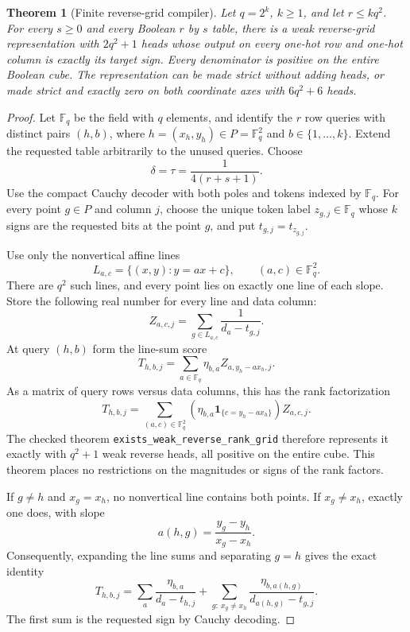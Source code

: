 \documentclass[11pt]{article}
\newtheorem{theorem}{Theorem}
\newcommand{\F}{\mathbb F}
\begin{document}
\begin{theorem}[Finite reverse-grid compiler]
Let $q=2^k$, $k\geq1$, and let $r\leq kq^2$. For every $s\geq0$ and every
Boolean $r$ by $s$ table, there is a weak reverse-grid representation with
$2q^2+1$ heads whose output on every one-hot row and one-hot column is exactly
its target sign. Every denominator is positive on the entire Boolean cube.
The representation can be made strict without adding heads, or made strict
and exactly zero on both coordinate axes with $6q^2+6$ heads.
\end{theorem}
\begin{proof}
Let $\F_q$ be the field with $q$ elements, and identify the $r$ row queries
with distinct pairs $(h,b)$, where $h=(x_h,y_h)\in P=\F_q^2$ and
$b\in\{1,\ldots,k\}$. Extend the requested table arbitrarily to the unused
queries. Choose
\[
 \delta=\tau=\frac1{4(r+s+1)}.
\]
Use the compact Cauchy decoder with both poles and tokens indexed by $\F_q$.
For every point $g\in P$ and column $j$, choose the unique token label
$z_{g,j}\in\F_q$ whose $k$ signs are the requested bits at the point $g$,
and put $t_{g,j}=t_{z_{g,j}}$.

Use only the nonvertical affine lines
\[
 L_{a,c}=\{(x,y):y=ax+c\},\qquad (a,c)\in\F_q^2.
\]
There are $q^2$ such lines, and every point lies on exactly one line of each
slope. Store the following real number for every line and data column:
\[
 Z_{a,c,j}=\sum_{g\in L_{a,c}}\frac1{d_a-t_{g,j}}.
\]
At query $(h,b)$ form the line-sum score
\[
 T_{h,b,j}=\sum_{a\in\F_q}\eta_{b,a}Z_{a,y_h-ax_h,j}.
\]
As a matrix of query rows versus data columns, this has the rank factorization
\[
 T_{h,b,j}=\sum_{(a,c)\in\F_q^2}
 \left(\eta_{b,a}\mathbf1_{\{c=y_h-ax_h\}}\right) Z_{a,c,j}.
\]
The checked theorem \texttt{exists\_weak\_reverse\_rank\_grid} therefore
represents it exactly with $q^2+1$ weak reverse heads, all positive on the
entire cube. This theorem places no restrictions on the magnitudes or signs
of the rank factors.

If $g\ne h$ and $x_g=x_h$, no nonvertical line contains both points. If
$x_g\ne x_h$, exactly one does, with slope
\[
 a(h,g)=\frac{y_g-y_h}{x_g-x_h}.
\]
Consequently, expanding the line sums and separating $g=h$ gives the exact
identity
\[
 T_{h,b,j}=
 \sum_a\frac{\eta_{b,a}}{d_a-t_{h,j}}
 +\sum_{g:\ x_g\ne x_h}
       \frac{\eta_{b,a(h,g)}}{d_{a(h,g)}-t_{g,j}}.
 \tag{1}
\]
The first sum is the requested sign by Cauchy decoding.


\end{proof}
\end{document}
